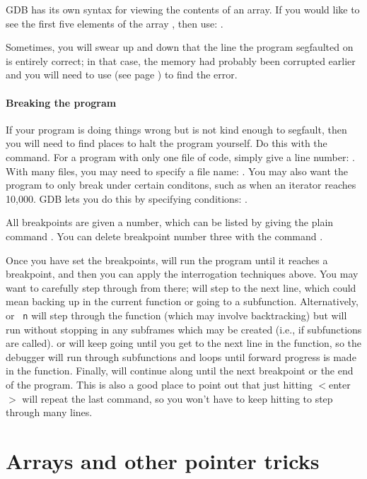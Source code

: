 \documentclass[12pt]{article}
\begin{document}
GDB has its own syntax for viewing the contents of an array. If you
would
like to see the first five elements of the array , then use:
.

Sometimes, you will swear up and down that the line the program segfaulted on is
entirely correct; in that case, the memory had probably been corrupted earlier and
you will need to use  (see page \pageref{valgrind}) to find the error.

\paragraph{Breaking the program} If your program is doing things wrong but is not kind
enough to segfault, then you will need to find places to halt the program
yourself. Do this with the  command. For a program with only
one file of code, simply give a line number: . With many
files, you may need to specify a file name: . You
may also want the program to only break under certain conditons, such
as when an iterator reaches 10,000. GDB lets you do this by specifying
conditions: .

All breakpoints are given a number, which can be listed by giving the
plain command . You can delete breakpoint number three with
the command .

Once you have set the breakpoints,  will run the program until it
reaches a breakpoint, and then you can apply the interrogation techniques
above. You may want to carefully step through from there; 
will step to the next line, which could mean backing up in the current
function or going to a subfunction. Alternatively,  or {\tt
n} will step through the function (which may involve backtracking) but
will run without stopping in any subframes which may be created
(i.e., if subfunctions are called).   or  will keep
going until you get to the next line in the function, so the debugger
will run through subfunctions and loops until forward progress is made
in the function.  Finally,  will continue along until the next
breakpoint or the end of the program. This is also a good place to
point out that just hitting $<$enter$>$ will repeat the last command,
so you won't have to keep hitting  to step through many lines.


\section{Arrays and other pointer tricks} \label{for_loops} 
\end{document}
